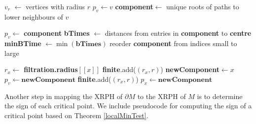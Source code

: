 \documentclass[a4paper,11pt]{article}
\theoremstyle{definition}
\begin{document}
\begin{algorithm}[H]
\begin{algorithmic}
    \State $v_r$ $\gets$ vertices with radius $r$
            \State $p_v\gets v$
        \Else
            \State \textbf{component}$\gets$ unique roots of paths to lower neighbours of $v$
        
                \State $p_v\gets $ \textbf{component}
            \Else
                \State \textbf{bTimes} $\gets$ distances from entries in \textbf{component} to \textbf{centre}
                \State \textbf{minBTime} $\gets \min(\textbf{bTimes})$ 
                \State reorder \textbf{component} from indices small to large

                    \State $r_x\gets$ \textbf{filtration.radius}$[[x]]$
                        \State \textbf{finite}.add($(r_x,r)$) 
                        \State \textbf{newComponent}$\gets x$
                        \State $p_v\gets \textbf{newComponent}$
                        \State \textbf{finite}.add($(r_x,r)$)
                    \EndIf
                \EndFor
                    \State $p_x\gets\textbf{newComponent}$
                \EndFor
            \EndIf
        \EndIf
    \EndFor
\EndFor
\end{algorithmic}
\end{algorithm}


Another step in mapping the XRPH of $\partial M$ to the XRPH of $M$ is to determine the sign of each critical point. We include pseudocode for computing the sign of a critical point based on Theorem \ref{localMinTest}.
\end{document}
